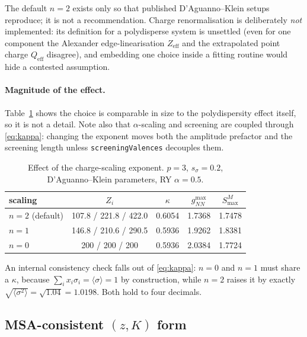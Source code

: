 \documentclass[11pt,a4paper]{article}
\newcommand{\code}[1]{\texttt{#1}}
\begin{document}
The default $n=2$ exists only so that published D'Aguanno--Klein setups
reproduce; it is not a recommendation. Charge renormalisation is deliberately
\emph{not} implemented: its definition for a polydisperse system is unsettled
(even for one component the Alexander edge-linearisation $Z_{\text{eff}}$ and
the extrapolated point charge $Q_{\text{eff}}$ disagree), and embedding one
choice inside a fitting routine would hide a contested assumption.

\paragraph{Magnitude of the effect.} Table~\ref{tab:charge} shows the choice
is comparable in size to the polydispersity effect itself, so it is not a
detail. Note also that $\alpha$-scaling and screening are coupled through
\eqref{eq:kappa}: changing the exponent moves both the amplitude prefactor
and the screening length unless \code{screeningValences} decouples them.

\begin{table}[htbp]
\centering
\caption{Effect of the charge-scaling exponent. $p=3$, $s_\sigma=0.2$,
D'Aguanno--Klein parameters, RY $\alpha=0.5$.}
\label{tab:charge}
\begin{tabular}{lcccc}
\toprule
scaling & $Z_i$ & $\kappa$ & $g_{NN}^{\max}$ & $S^M_{\max}$\\
\midrule
$n=2$ (default) & 107.8 / 221.8 / 422.0 & 0.6054 & 1.7368 & 1.7478\\
$n=1$           & 146.8 / 210.6 / 290.5 & 0.5936 & 1.9262 & 1.8381\\
$n=0$           & 200 / 200 / 200        & 0.5936 & 2.0384 & 1.7724\\
\bottomrule
\end{tabular}
\end{table}

An internal consistency check falls out of \eqref{eq:kappa}: $n=0$ and $n=1$
must share a $\kappa$, because $\sum_i x_i\sigma_i=\langle\sigma\rangle=1$ by
construction, while $n=2$ raises it by exactly
$\sqrt{\langle\sigma^2\rangle}=\sqrt{1.04}=1.0198$. Both hold to four
decimals.

\subsection{MSA-consistent \texorpdfstring{$(z,K)$}{(z,K)} form}
\label{sec:zk}
\end{document}
